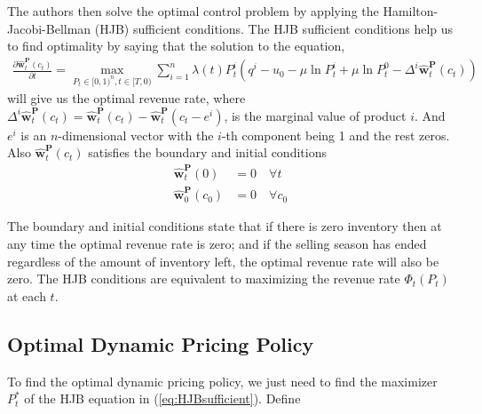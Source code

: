 

The authors then solve the optimal control problem by applying the Hamilton-Jacobi-Bellman (HJB) sufficient conditions. The HJB sufficient conditions help us to find optimality by saying that the solution to the equation,
\begin{align}
\frac{\partial \hat{\mathbf{w}}_t^{\mathbf{P}}(c_t)}{\partial t} = \max_{P_t \in [0,1)^n, t \in [T,0)}\sum_{i=1}^{n} \lambda(t)P_t^i \left(q^i-u_0-\mu \ln P_t^i + \mu \ln P_t^0- \Delta^i \hat{\mathbf{w}}_t^{\mathbf{P}}(c_t)\right) \label{eq:HJBsufficient}
\end{align}
will give us the optimal revenue rate, %
where $\Delta^i \hat{\mathbf{w}}_t^{\mathbf{P}}(c_t) = \hat{\mathbf{w}}_t^{\mathbf{P}}(c_t) - \hat{\mathbf{w}}_t^{\mathbf{P}}(c_t-e^i)$, is the marginal value of product $i$. And $e^i$ is an $n$-dimensional vector with the $i$-th component being 1 and the rest zeros. Also $\hat{\mathbf{w}}_t^{\mathbf{P}}(c_t)$ satisfies the boundary and initial conditions
\begin{align}
\hat{\mathbf{w}}_t^{\mathbf{P}}(0) &= 0 \quad \forall t\\
\hat{\mathbf{w}}_0^{\mathbf{P}}(c_0) &= 0 \quad \forall c_0
\end{align}

The boundary and initial conditions state that if there is zero inventory then at any time the optimal revenue rate is zero; and if the selling season has ended regardless of the amount of inventory left, the optimal revenue rate will also be zero. The HJB conditions are equivalent to maximizing the revenue rate $\Phi_t(P_t)$ at each $t$.

\subsection{Optimal Dynamic Pricing Policy}

To find the optimal dynamic pricing policy, we just need to find the maximizer $P_t^\ast$ of the HJB equation in (\ref{eq:HJBsufficient}). Define

